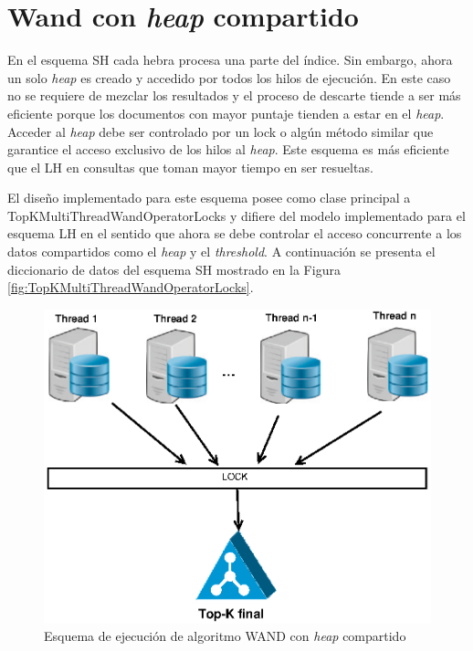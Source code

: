 \section{Wand con \textit{heap} compartido}
\label{scheduling:whc}
En el esquema SH cada hebra procesa una parte del índice. Sin embargo, ahora un solo \textit{heap} es creado y accedido por todos los hilos de ejecución. En este caso no se requiere de mezclar los resultados y el proceso de descarte tiende a ser más eficiente porque los documentos con mayor puntaje tienden a estar en el \textit{heap}. Acceder al \textit{heap} debe ser controlado por un lock o algún método similar que garantice el acceso exclusivo de los hilos al \textit{heap}. Este esquema es más eficiente que el LH en consultas que toman mayor tiempo en ser resueltas.

El diseño implementado para este esquema posee como clase principal a TopKMultiThreadWandOperatorLocks y difiere del modelo implementado para el esquema LH en el sentido que ahora se debe controlar el acceso concurrente a los datos compartidos como el \textit{heap} y el \textit{threshold}. A continuación se presenta el diccionario de datos del esquema SH mostrado en la Figura \ref{fig:TopKMultiThreadWandOperatorLocks}.

\begin{figure}[!ht]
\centering
\includegraphics[scale=.75]{images/wand_heaps_compartido.eps}
\caption{Esquema de ejecución de algoritmo WAND con \textit{heap} compartido}
\label{fig:wand-heap-compartido}
\end{figure}

